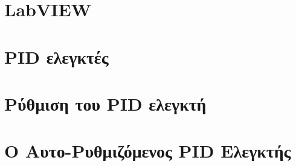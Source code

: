 \documentclass[a4paper,11pt,twoside]{book}
\author{\me}
\begin{document}
\setcounter{page}{3}



\clearemptydoublepage



\clearemptydoublepage



\clearemptydoublepage



\clearemptydoublepage



\clearemptydoublepage

\pagestyle{fancy}

\tableofcontents
\clearemptydoublepage

\setcounter{page}{1}


\clearemptydoublepage

\chapter{LabVIEW}\label{ch:chap1}

\clearemptydoublepage

\chapter{PID ελεγκτές}\label{ch:chap2}

\clearemptydoublepage

\chapter{Ρύθμιση του PID ελεγκτή}\label{ch:chap3}

\clearemptydoublepage

\chapter{Ο Αυτο-Ρυθμιζόμενος PID Ελεγκτής}\label{ch:chap4}

\clearemptydoublepage


\clearemptydoublepage


\end{document}
